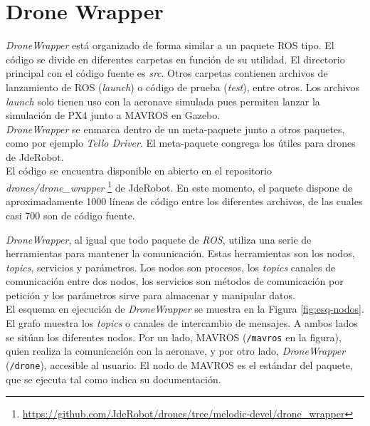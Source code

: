\documentclass[../main.tex]{subfiles}
\begin{document}
\section{Drone Wrapper} \label{section:infra-wrapper}
\emph{DroneWrapper} está organizado de forma similar a un paquete ROS tipo. El código se divide en diferentes carpetas en función de su utilidad. El directorio principal con el código fuente es \emph{src}. Otros carpetas contienen archivos de lanzamiento de ROS (\emph{launch}) o código de prueba (\emph{test}), entre otros. Los archivos \emph{launch} solo tienen uso con la aeronave simulada pues permiten lanzar la simulación de PX4 junto a MAVROS en Gazebo. \\
\emph{DroneWrapper} se enmarca dentro de un meta-paquete junto a otros paquetes, como por ejemplo \emph{Tello Driver}. El meta-paquete congrega los útiles para drones de JdeRobot. \\
El código se encuentra disponible en abierto en el repositorio \emph{drones/drone\_wrapper} \footnote{\url{https://github.com/JdeRobot/drones/tree/melodic-devel/drone_wrapper}} de JdeRobot. En este momento, el paquete dispone de aproximadamente 1000 líneas de código entre los diferentes archivos, de las cuales casi 700 son de código fuente.

\emph{DroneWrapper}, al igual que todo paquete de \emph{ROS}, utiliza una serie de herramientas para mantener la comunicación. Estas herramientas son los nodos, \emph{topics}, servicios y parámetros. Los nodos son procesos, los \emph{topics} canales de comunicación entre dos nodos, los servicios son métodos de comunicación por petición y los parámetros sirve para almacenar y manipular datos. \\
El esquema en ejecución de \emph{DroneWrapper} se muestra en la Figura \ref{fig:esq-nodos}. El grafo muestra los \emph{topics} o canales de intercambio de mensajes. A ambos lados se sitúan los diferentes nodos. Por un lado, MAVROS (\lstinline{/mavros} en la figura), quien realiza la comunicación con la aeronave, y por otro lado, \emph{DroneWrapper} (\lstinline{/drone}), accesible al usuario. El nodo de MAVROS es el estándar del paquete, que se ejecuta tal como indica su documentación.

\end{document}

